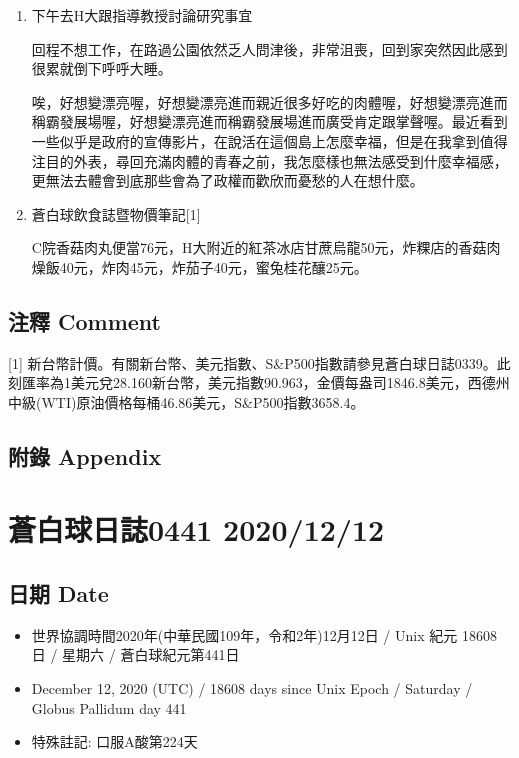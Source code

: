 \documentclass[
]{article}
\providecommand{\tightlist}{%
  \setlength{\itemsep}{0pt}\setlength{\parskip}{0pt}}
\begin{document}
\begin{enumerate}
\def\labelenumi{\arabic{enumi}.}
\item
  下午去H大跟指導教授討論研究事宜

  回程不想工作，在路過公園依然乏人問津後，非常沮喪，回到家突然因此感到很累就倒下呼呼大睡。

  唉，好想變漂亮喔，好想變漂亮進而親近很多好吃的肉體喔，好想變漂亮進而稱霸發展場喔，好想變漂亮進而稱霸發展場進而廣受肯定跟掌聲喔。最近看到一些似乎是政府的宣傳影片，在說活在這個島上怎麼幸福，但是在我拿到值得注目的外表，尋回充滿肉體的青春之前，我怎麼樣也無法感受到什麼幸福感，更無法去體會到底那些會為了政權而歡欣而憂愁的人在想什麼。
\item
  蒼白球飲食誌暨物價筆記{[}1{]}

  C院香菇肉丸便當76元，H大附近的紅茶冰店甘蔗烏龍50元，炸粿店的香菇肉燥飯40元，炸肉45元，炸茄子40元，蜜兔桂花釀25元。
\end{enumerate}

\hypertarget{ux6ce8ux91cb-comment-10}{%
\subsection{注釋 Comment}\label{ux6ce8ux91cb-comment-10}}

{[}1{]}
新台幣計價。有關新台幣、美元指數、S\&P500指數請參見蒼白球日誌0339。此刻匯率為1美元兌28.160新台幣，美元指數90.963，金價每盎司1846.8美元，西德州中級(WTI)原油價格每桶46.86美元，S\&P500指數3658.4。

\hypertarget{ux9644ux9304-appendix-10}{%
\subsection{附錄 Appendix}\label{ux9644ux9304-appendix-10}}

\hypertarget{ux84bcux767dux7403ux65e5ux8a8c0441-20201212}{%
\section{蒼白球日誌0441
2020/12/12}\label{ux84bcux767dux7403ux65e5ux8a8c0441-20201212}}

\hypertarget{ux65e5ux671f-date-11}{%
\subsection{日期 Date}\label{ux65e5ux671f-date-11}}

\begin{itemize}
\tightlist
\item
  世界協調時間2020年(中華民國109年，令和2年)12月12日 / Unix 紀元 18608
  日 / 星期六 / 蒼白球紀元第441日
\item
  December 12, 2020 (UTC) / 18608 days since Unix Epoch / Saturday /
  Globus Pallidum day 441
\item
  特殊註記: 口服A酸第224天
\end{itemize}
\end{document}
